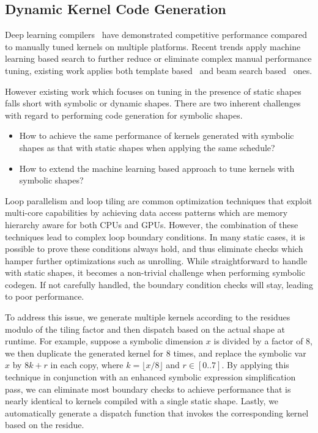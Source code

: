 \subsection{Dynamic Kernel Code Generation}
\label{sec:compliation:codegen}
Deep learning compilers~\citep{tvm_osdi18, halide} have demonstrated competitive performance compared to manually
  tuned kernels on multiple platforms.
Recent trends apply machine learning based search to further reduce or eliminate complex manual performance tuning,
  existing work applies both template based~\citep{chen2018learning, zheng2020flextensor} and beam search based~\citep{adams2019learning} ones.

However existing work which focuses on tuning in the presence of static shapes falls short with symbolic or dynamic shapes.
There are two inherent challenges with regard to performing code generation for symbolic shapes.
\begin{itemize}
    \item How to achieve the same performance of kernels generated with symbolic shapes as that with static shapes when applying the same schedule?
    \item How to extend the machine learning based approach to tune kernels with symbolic shapes?
\end{itemize}

Loop parallelism and loop tiling are common optimization techniques that exploit multi-core capabilities by achieving data access patterns which
  are memory hierarchy aware for both CPUs and GPUs. However, the combination of these techniques lead to complex loop boundary conditions.
In many static cases, it is possible to prove these conditions always hold, and thus eliminate checks which hamper further optimizations such as unrolling.
While straightforward to handle with static shapes, it becomes a non-trivial challenge when performing symbolic codegen.
If not carefully handled, the boundary condition checks will stay, leading to poor performance.

To address this issue, we generate multiple kernels according to the residues modulo of the tiling
  factor and then dispatch based on the actual shape at runtime.
For example, suppose a symbolic dimension $x$ is divided by a factor of 8, we then duplicate the generated kernel
  for 8 times, and replace the symbolic var $x$ by $8k+r$ in each copy, where $k = \lfloor x / 8 \rfloor$ and $r \in [0..7]$.
By applying this technique in conjunction with an enhanced symbolic expression simplification pass,
  we can eliminate most boundary checks to achieve performance that is nearly identical
  to kernels compiled with a single static shape.
Lastly, we automatically generate a dispatch function that invokes the corresponding kernel based on the residue.

